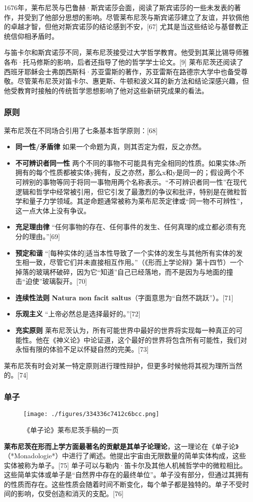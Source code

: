 1676年，莱布尼茨与巴鲁赫·斯宾诺莎会面，阅读了斯宾诺莎的一些未发表的著作，并受到了他部分思想的影响。尽管莱布尼茨与斯宾诺莎建立了友谊，并钦佩他的卓越才智，但他对斯宾诺莎的结论感到不安，[67] 尤其是当这些结论与基督教正统信仰相矛盾时。

与笛卡尔和斯宾诺莎不同，莱布尼茨接受过大学哲学教育。他受到其莱比锡导师雅各布·托马修斯的影响，后者还指导了他的哲学学士论文。[9] 莱布尼茨还阅读了西班牙耶稣会士弗朗西斯科·苏亚雷斯的著作，苏亚雷斯在路德宗大学中也备受尊敬。尽管莱布尼茨对笛卡尔、惠更斯、牛顿和波义耳的新方法和结论深感兴趣，但他受教育时接触的传统哲学思想影响了他对这些新研究成果的看法。
\subsubsection{原则}
莱布尼茨在不同场合引用了七条基本哲学原则：[68]

\begin{itemize}
\item \textbf{同一性/矛盾律} 如果一个命题为真，则其否定为假，反之亦然。
\item \textbf{不可辨识者同一性}  
   两个不同的事物不可能具有完全相同的性质。如果实体x所拥有的每个性质都被实体y拥有，反之亦然，那么x和y是同一的；假设两个不可辨别的事物等同于将同一事物用两个名称表示。“不可辨识者同一性”在现代逻辑和哲学中经常被引用，但它引发了最激烈的争议和批评，特别是在微粒哲学和量子力学领域。其逆命题通常被称为莱布尼茨定律或“同一物不可辨性”，这一点大体上没有争议。
\item \textbf{充足理由律} 
   “任何事物的存在、任何事件的发生、任何真理的成立都必须有充分的理由。”[69]
\item \textbf{预定和谐}  
   “[每种实体的]适当本性导致了一个实体的发生与其他所有实体的发生相一致，尽管它们并未直接相互作用。”（《形而上学论辩》第十四节）一个掉落的玻璃杯破碎，因为它“知道”自己已经落地，而不是因为与地面的撞击“迫使”玻璃裂开。[70]
\item \textbf{连续性法则}  
   \textbf{Natura non facit saltus}（字面意思为“自然不跳跃”）。[71]
\item \textbf{乐观主义}  
   “上帝必然总是选择最好的。”[72]
\item \textbf{充实原则}  
   莱布尼茨认为，所有可能世界中最好的世界将实现每一种真正的可能性。他在《神义论》中论证道，这个最好的世界将包含所有可能性，我们对永恒有限的体验不足以怀疑自然的完美。[73]
\end{itemize}
莱布尼茨有时会对某一特定原则进行理性辩护，但更多时候他将其视为理所当然的。[74]
\subsubsection{单子}
\begin{figure}[ht]
\centering
\texttt{[image: ./figures/334336c7412c6bcc.png]}
\caption{《单子论》莱布尼茨手稿的一页} \label{fig_LBNC_5}
\end{figure}
\textbf{莱布尼茨在形而上学方面最著名的贡献是其单子论理论}，这一理论在《单子论》（*Monadologie*）中进行了阐述。他提出宇宙由无限数量的简单实体构成，这些实体被称为单子。[75] 单子可以与勒内·笛卡尔及其他人机械哲学中的微粒相比。这些简单实体或单子是“自然界中存在的最终单位”。单子没有部分，但通过其拥有的性质而存在。这些性质会随着时间不断变化，每个单子都是独特的。单子不受时间的影响，仅受创造和消灭的支配。[76] 

